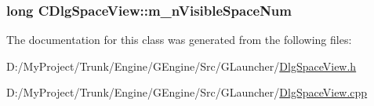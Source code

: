 \subsubsection[{m\+\_\+n\+Visible\+Space\+Num}]{\setlength{\rightskip}{0pt plus 5cm}long C\+Dlg\+Space\+View\+::m\+\_\+n\+Visible\+Space\+Num}\label{class_c_dlg_space_view_af16ef4e04f01d082467b9afc0fb36aef}


The documentation for this class was generated from the following files\+:\begin{DoxyCompactItemize}
\item 
D\+:/\+My\+Project/\+Trunk/\+Engine/\+G\+Engine/\+Src/\+G\+Launcher/\hyperlink{_dlg_space_view_8h}{Dlg\+Space\+View.\+h}\item 
D\+:/\+My\+Project/\+Trunk/\+Engine/\+G\+Engine/\+Src/\+G\+Launcher/\hyperlink{_dlg_space_view_8cpp}{Dlg\+Space\+View.\+cpp}\end{DoxyCompactItemize}
